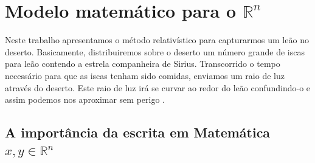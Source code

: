 %
%
%
%
%
%
\chapter{Modelo matemático para o \texorpdfstring{$\mathbb{R}^n$}{Rn}}

Neste trabalho apresentamos o método relativístico para capturarmos um leão no deserto. Basicamente, distribuiremos sobre o deserto um número grande de iscas para leão contendo a estrela companheira de Sirius. Transcorrido o tempo necessário para que as iscas tenham sido comidas, enviamos um raio de luz através do deserto. Este raio de luz irá se curvar ao redor do leão confundindo-o e assim podemos nos aproximar sem perigo \cite{einstein}.


\section{A importância da escrita em Matemática \texorpdfstring{$x,y \in \mathbb{R}^n$}{x,y Rn}}

